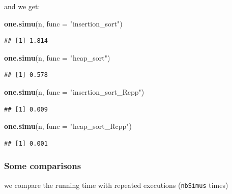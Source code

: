 \documentclass[
]{article}
\newenvironment{Shaded}{\begin{snugshade}}{\end{snugshade}}
\newcommand{\AttributeTok}[1]{\textcolor[rgb]{0.13,0.29,0.53}{#1}}
\newcommand{\FunctionTok}[1]{\textcolor[rgb]{0.13,0.29,0.53}{\textbf{#1}}}
\newcommand{\NormalTok}[1]{#1}
\newcommand{\StringTok}[1]{\textcolor[rgb]{0.31,0.60,0.02}{#1}}
\begin{document}
and we get:

\begin{Shaded}
\begin{Highlighting}[]
\FunctionTok{one.simu}\NormalTok{(n, }\AttributeTok{func =} \StringTok{"insertion\_sort"}\NormalTok{)}
\end{Highlighting}
\end{Shaded}

\begin{verbatim}
## [1] 1.814
\end{verbatim}

\begin{Shaded}
\begin{Highlighting}[]
\FunctionTok{one.simu}\NormalTok{(n, }\AttributeTok{func =} \StringTok{"heap\_sort"}\NormalTok{)}
\end{Highlighting}
\end{Shaded}

\begin{verbatim}
## [1] 0.578
\end{verbatim}

\begin{Shaded}
\begin{Highlighting}[]
\FunctionTok{one.simu}\NormalTok{(n, }\AttributeTok{func =} \StringTok{"insertion\_sort\_Rcpp"}\NormalTok{)}
\end{Highlighting}
\end{Shaded}

\begin{verbatim}
## [1] 0.009
\end{verbatim}

\begin{Shaded}
\begin{Highlighting}[]
\FunctionTok{one.simu}\NormalTok{(n, }\AttributeTok{func =} \StringTok{"heap\_sort\_Rcpp"}\NormalTok{)}
\end{Highlighting}
\end{Shaded}

\begin{verbatim}
## [1] 0.001
\end{verbatim}

\subsubsection{Some comparisons}\label{some-comparisons}

we compare the running time with repeated executions (\texttt{nbSimus}
times)
\end{document}
